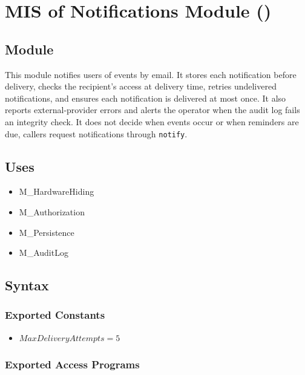 \documentclass[12pt, titlepage]{article}
\newcommand{\moduleid}[1]{\texttt{\detokenize{#1}}}
\begin{document}
\newpage

\section[MIS of Notifications Module]{MIS of Notifications Module (\moduleid{M_Notifications})}
\label{M_Notifications}

\subsection{Module}

This module notifies users of events by email.
It stores each notification before delivery, checks the recipient's access at delivery time,
retries undelivered notifications, and ensures each notification is delivered at most once.
It also reports external-provider errors and alerts the operator when the audit log fails an integrity check.
It does not decide when events occur or when reminders are due, callers request notifications through \texttt{notify}.

\subsection{Uses}

\begin{itemize}
    \item M\_HardwareHiding
    \item M\_Authorization
    \item M\_Persistence
    \item M\_AuditLog
\end{itemize}

\subsection{Syntax}

\subsubsection{Exported Constants}
\begin{itemize}
    \item $\mathit{MaxDeliveryAttempts}=5$
\end{itemize}

\subsubsection{Exported Access Programs}
\end{document}
